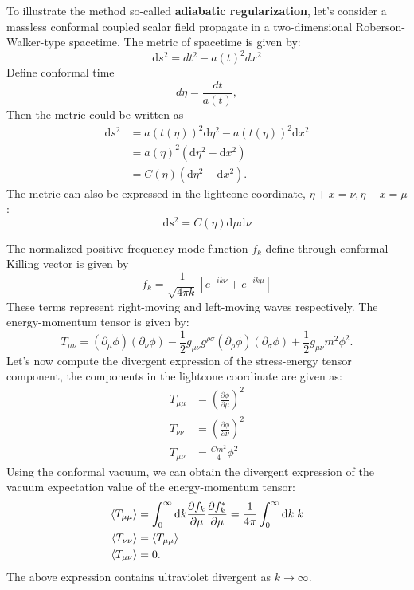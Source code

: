 \documentclass[12pt]{article}
\numberwithin{equation}{section}
\theoremstyle{1style}
\newcommand{\p}{\partial}
\newcommand{\id}{\mathrm{d}}
\begin{document}
To illustrate the method so-called \textbf{adiabatic regularization}, let's consider a massless conformal coupled scalar field propagate 
in a two-dimensional Roberson-Walker-type spacetime. The metric of spacetime is given by:
\begin{equation}
  \id s^2 = dt^2 -a(t)^2 dx^2
\end{equation}
Define conformal time 
\begin{equation}
    d\eta= \frac{dt}{a(t)},
\end{equation}
Then the metric could be written as 
\begin{align}
    \id s^2 &= a(t(\eta))^2\id\eta^2 -a(t(\eta))^2 \id x^2\\
    &=a(\eta)^2(\id\eta^2 - \id x^2)\\
    &=C(\eta)(\id \eta^2 - \id x^2).
\end{align}
The metric can also be expressed in the lightcone coordinate, \(\eta+x=\nu, \eta-x=\mu\):
\begin{equation}
    \id s^2 = C(\eta)\id\mu \id\nu
\end{equation}

The normalized positive-frequency mode function \(f_{k}\) define through conformal Killing vector is given by 
\begin{equation}
  f_k = \frac{1}{\sqrt{4\pi k}}\left[e^{-ik\nu} +e^{-ik\mu}\right] 
\end{equation} 
These terms represent right-moving and left-moving waves respectively.
The energy-momentum tensor is given by:
\begin{equation}
    T_{\mu\nu}=(\partial_{\mu}\phi)(\partial_{\nu}\phi)-\frac{1}{2}g_{\mu\nu}g^{\rho\sigma}(\partial_{\rho}\phi)(\partial_{\sigma}\phi)+\frac{1}{2}g_{\mu\nu}m^2\phi^2.
\end{equation}
Let's now compute the divergent expression of the stress-energy tensor component, the components in the lightcone coordinate are given as:
\begin{align}
  T_{\mu\mu}&=\left(\frac{\p \phi}{\p\mu}\right)^2\\
T_{\nu\nu}&= \left(\frac{\p \phi}{\p\nu}\right)^2\\
T_{\mu\nu}&= \frac{Cm^2}{4}\phi^2
\end{align}
Using the conformal vacuum, we can obtain the divergent expression  of the vacuum expectation value of the energy-momentum tensor:
\begin{align}
  \expval{T_{\mu\mu}}&=\int_0^\infty \id k\frac{\p f_k}{\p \mu}\frac{\p f_k^*}{\p \mu}=\frac{1}{4\pi}\int_0^\infty \id k\; k\label{dT1}\\
  \expval{T_{\nu\nu}}&=\expval{T_{\mu\mu}}\\
  \expval{T_{\mu\nu}}&=0.\label{dT3}
\end{align}
The above expression contains ultraviolet divergent as \(k \rightarrow \infty\).
\end{document}
